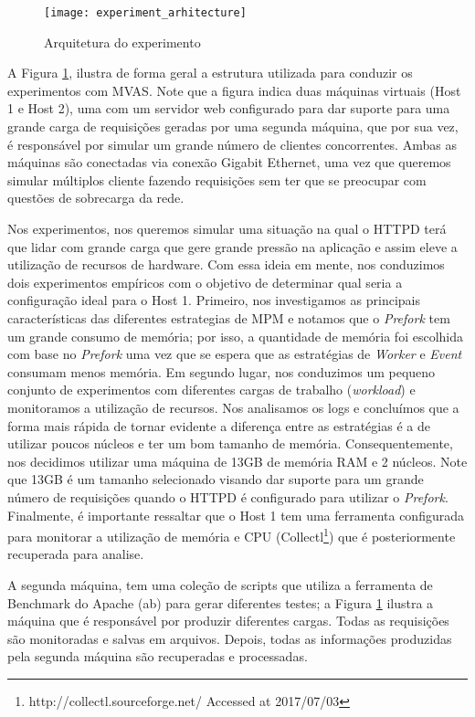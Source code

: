 \begin{figure}[!h]
  \centering
  \texttt{[image: experiment\_arhitecture]}
  \caption{Arquitetura do experimento}
  \label{fig:experiment_architecture}
\end{figure}

A Figura  \ref{fig:experiment_architecture}, ilustra de forma geral a estrutura
utilizada para conduzir os experimentos com MVAS. Note que a figura indica duas
máquinas virtuais (Host 1 e Host 2), uma com um servidor web configurado para
dar suporte para uma grande carga de requisições geradas por uma segunda
máquina, que por sua vez, é responsável por simular um grande número de
clientes concorrentes. Ambas as máquinas são conectadas via conexão Gigabit
Ethernet, uma vez que queremos simular múltiplos cliente fazendo requisições
sem ter que se preocupar com questões de sobrecarga da rede.

Nos experimentos, nos queremos simular uma situação na qual o HTTPD terá que
lidar com grande carga que gere grande pressão na aplicação e assim
eleve a utilização de recursos de hardware. Com essa ideia em mente, nos
conduzimos dois experimentos empíricos com o objetivo de determinar qual seria
a configuração ideal para o Host 1. Primeiro, nos investigamos as principais
características das diferentes estrategias de MPM e notamos que o
\emph{Prefork} tem um grande consumo de memória; por isso, a quantidade de
memória foi escolhida com base no \emph{Prefork} uma vez que se espera que as
estratégias de \emph{Worker} e \emph{Event} consumam menos memória. Em segundo
lugar, nos conduzimos um pequeno conjunto de experimentos com diferentes cargas
de trabalho (\emph{workload}) e monitoramos a utilização de recursos. Nos
analisamos os logs e concluímos que a forma mais rápida de tornar evidente a
diferença entre as estratégias é a de utilizar poucos núcleos e ter um bom
tamanho de memória. Consequentemente, nos decidimos utilizar uma máquina de
13GB de memória RAM e 2 núcleos. Note que 13GB é um tamanho selecionado visando
dar suporte para um grande número de requisições quando o HTTPD é configurado
para utilizar o \emph{Prefork}. Finalmente, é importante ressaltar que o Host 1
tem uma ferramenta configurada para monitorar a utilização de memória e CPU
(Collectl\footnote{http://collectl.sourceforge.net/ Accessed at 2017/07/03})
que é posteriormente recuperada para analise.

A segunda máquina, tem uma coleção de scripts que utiliza a ferramenta de
Benchmark do Apache (ab) para gerar diferentes testes; a Figura
\ref{fig:experiment_architecture} ilustra a máquina que é responsável por
produzir diferentes cargas. Todas as requisições são monitoradas e salvas em
arquivos. Depois, todas as informações produzidas pela segunda máquina são
recuperadas e processadas.

